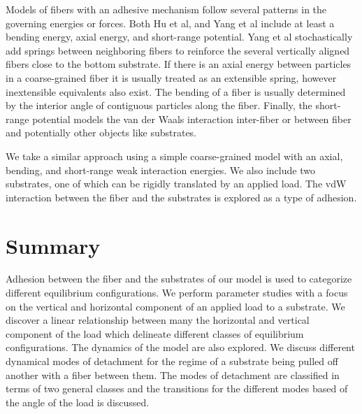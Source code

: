 	Models of fibers with an adhesive mechanism follow several patterns in the governing energies or forces. Both Hu et al, and Yang et al include at least a bending energy, axial energy, and short-range potential. Yang et al stochastically add springs between neighboring fibers to reinforce the several vertically aligned fibers close to the bottom substrate. If there is an axial energy between particles in a coarse-grained fiber it is usually treated as an extensible spring, however inextensible equivalents also exist. The bending of a fiber is usually determined by the interior angle of contiguous particles along the fiber. Finally, the short-range potential models the van der Waals interaction inter-fiber or between fiber and potentially other objects like substrates. 

	We take a similar approach using a simple coarse-grained model with an axial, bending, and short-range weak interaction energies. We also include two substrates, one of which can be rigidly translated by an applied load. The vdW interaction between the fiber and the substrates is explored as a type of adhesion.
	
\section{Summary}

	Adhesion between the fiber and the substrates of our model is used to categorize different equilibrium configurations. We perform parameter studies with a focus on the vertical and horizontal component of an applied load to a substrate. We discover a linear relationship between many the horizontal and vertical component of the load which delineate different classes of equilibrium configurations. The dynamics of the model are also explored. We discuss different dynamical modes of detachment for the regime of a substrate being pulled off another with a fiber between them. The modes of detachment are classified in terms of two general classes and the transitions for the different modes based of the angle of the load is discussed.
		
